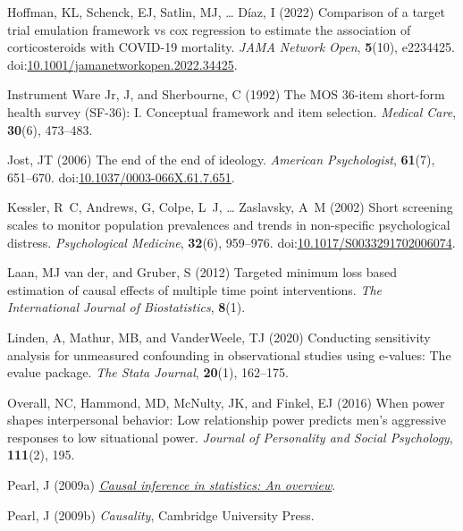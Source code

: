 \documentclass[
  single column]{article}
\newlength{\cslhangindent}
\newenvironment{CSLReferences}[2] %
 {\begin{list}{}{%
  \setlength{\itemindent}{0pt}
  \setlength{\leftmargin}{0pt}
  \setlength{\parsep}{0pt}
  \ifodd #1
   \setlength{\leftmargin}{\cslhangindent}
   \setlength{\itemindent}{-1\cslhangindent}
  \fi
  \setlength{\itemsep}{#2\baselineskip}}}
 {\end{list}}
\begin{document}
\begin{CSLReferences}{1}{0}
Hoffman, KL, Schenck, EJ, Satlin, MJ, \ldots{} Díaz, I (2022) Comparison
of a target trial emulation framework vs cox regression to estimate the
association of corticosteroids with COVID-19 mortality. \emph{JAMA
Network Open}, \textbf{5}(10), e2234425.
doi:\href{https://doi.org/10.1001/jamanetworkopen.2022.34425}{10.1001/jamanetworkopen.2022.34425}.

Instrument Ware Jr, J, and Sherbourne, C (1992) The MOS 36-item
short-form health survey (SF-36): I. Conceptual framework and item
selection. \emph{Medical Care}, \textbf{30}(6), 473--483.

Jost, JT (2006) The end of the end of ideology. \emph{American
Psychologist}, \textbf{61}(7), 651--670.
doi:\href{https://doi.org/10.1037/0003-066X.61.7.651}{10.1037/0003-066X.61.7.651}.

Kessler, R~C, Andrews, G, Colpe, L~J, \ldots{} Zaslavsky, A~M (2002)
Short screening scales to monitor population prevalences and trends in
non-specific psychological distress. \emph{Psychological Medicine},
\textbf{32}(6), 959--976.
doi:\href{https://doi.org/10.1017/S0033291702006074}{10.1017/S0033291702006074}.

Laan, MJ van der, and Gruber, S (2012) Targeted minimum loss based
estimation of causal effects of multiple time point interventions.
\emph{The International Journal of Biostatistics}, \textbf{8}(1).

Linden, A, Mathur, MB, and VanderWeele, TJ (2020) Conducting sensitivity
analysis for unmeasured confounding in observational studies using
e-values: The evalue package. \emph{The Stata Journal}, \textbf{20}(1),
162--175.

Overall, NC, Hammond, MD, McNulty, JK, and Finkel, EJ (2016) When power
shapes interpersonal behavior: Low relationship power predicts men's
aggressive responses to low situational power. \emph{Journal of
Personality and Social Psychology}, \textbf{111}(2), 195.

Pearl, J (2009a) \emph{\href{https://doi.org/10.1214/09-SS057}{Causal
inference in statistics: An overview}}.

Pearl, J (2009b) \emph{Causality}, Cambridge University Press.


\end{CSLReferences}
\end{document}
